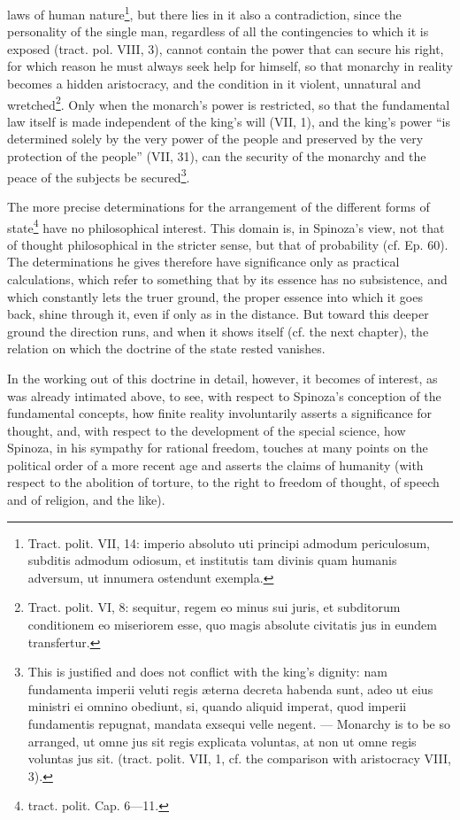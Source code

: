 \documentclass[12pt,a4paper,openany]{book}
\newcommand{\opage}[1]{\marginnote{\footnotesize\textit{[#1]}}}
\begin{document}
\opage{145}\setcounter{footnote}{0}laws of human nature\footnote{Tract. polit. VII, 14: imperio absoluto uti principi admodum periculosum, subditis admodum odiosum, et institutis tam divinis quam humanis adversum, ut innumera ostendunt exempla.}, but there lies in it also a contradiction, since the personality of the single man, regardless of all the contingencies to which it is exposed (tract. pol. VIII, 3), cannot contain the power that can secure his right, for which reason he must always seek help for himself, so that monarchy in reality becomes a hidden aristocracy, and the condition in it violent, unnatural and wretched\footnote{Tract. polit. VI, 8: sequitur, regem eo minus sui juris, et subditorum conditionem eo miseriorem esse, quo magis absolute civitatis jus in eundem transfertur.}. Only when the monarch's power is restricted, so that the fundamental law itself is made independent of the king's will (VII, 1), and the king's power ``is determined solely by the very power of the people and preserved by the very protection of the people'' (VII, 31), can the security of the monarchy and the peace of the subjects be secured\footnote{This is justified and does not conflict with the king's dignity: nam fundamenta imperii veluti regis æterna decreta habenda sunt, adeo ut eius ministri ei omnino obediunt, si, quando aliquid imperat, quod imperii fundamentis repugnat, mandata exsequi velle negent. --- Monarchy is to be so arranged, ut omne jus sit regis explicata voluntas, at non ut omne regis voluntas jus sit. (tract. polit. VII, 1, cf. the comparison with aristocracy VIII, 3).}.

The more precise determinations for the arrangement of the different forms of state\footnote{tract. polit. Cap. 6---11.} have no philosophical interest. This domain is, in Spinoza's view, not that of thought philosophical in the stricter sense, but that of probability (cf. Ep. 60). The determinations he gives therefore have significance only as practical calculations, which refer to something that by its essence has no subsistence, and which constantly lets the truer ground, the proper essence into which it goes back, shine through it, even if only as in the distance. But toward this deeper ground the direction runs, and when it shows itself (cf. the next chapter), the relation on which the doctrine of the state rested vanishes.

\opage{146}\setcounter{footnote}{0}In the working out of this doctrine in detail, however, it becomes of interest, as was already intimated above, to see, with respect to Spinoza's conception of the fundamental concepts, how finite reality involuntarily asserts a significance for thought, and, with respect to the development of the special science, how Spinoza, in his sympathy for rational freedom, touches at many points on the political order of a more recent age and asserts the claims of humanity (with respect to the abolition of torture, to the right to freedom of thought, of speech and of religion, and the like).
\end{document}
